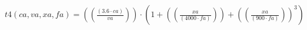 \documentclass[preview,border=1pt]{standalone}
\begin{document}
$
t4 (ca,va,xa,fa) = \left(\left(\frac{\left(\num{3.6}\cdot ca\right)}{va}\right)\right)\cdot \left(\num{1}+\left(\left(\frac{xa}{\left(\num{4000}\cdot fa\right)}\right)\right)+\left(\left(\frac{xa}{\left(\num{900}\cdot fa\right)}\right)\right)^{\num{3}}\right)
$
\end{document}
